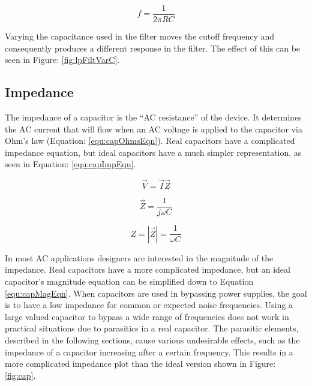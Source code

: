 \begin{equation}
\label{equ:lpfilter_eqn}
f = \frac{1}{2\pi RC}
\end{equation}

Varying the capacitance used in the filter moves the cutoff frequency and consequently produces a different response in the filter. The effect of this can be seen in Figure: \ref{fig:lpFiltVarC}.



\subsection{Impedance}

The impedance of a capacitor is the ``AC resistance'' of the device. It determines the AC current that will flow when an AC voltage is applied to the capacitor via Ohm's law (Equation: \eqref{equ:capOhmsEqn}). Real capacitors have a complicated impedance equation, but ideal capacitors have a much simpler representation, as seen in Equation: \eqref{equ:capImpEqu}.

\begin{equation}
\label{equ:capOhmsEqn}
\vec{V} = \vec{I} \vec{Z}
\end{equation}

\begin{equation}
\label{equ:capImpEqu}
\vec{Z} = \frac{1}{j\omega C}
\end{equation}

\begin{equation}
\label{equ:capMagEqn}
Z = |\vec{Z}| = \frac{1}{\omega C}
\end{equation}

In most AC applications designers are interested in the magnitude of the impedance. Real capacitors have a more complicated impedance, but an ideal capacitor's magnitude equation can be simplified down to Equation \eqref{equ:capMagEqn}. When capacitors are used in bypassing power supplies, the goal is to have a low impedance for common or expected noise frequencies. Using a large valued capacitor to bypass a wide range of frequencies does not work in practical situations due to parasitics in a real capacitor. The parasitic elements, described in the following sections, cause various undesirable effects, such as the impedance of a capacitor increasing after a certain frequency. This results in a more complicated impedance plot than the ideal version shown in Figure: \ref{fig:cap}.



